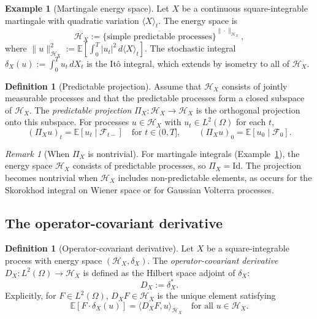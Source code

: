 \documentclass[11pt,a4paper]{article}
\theoremstyle{plain}
\theoremstyle{definition}
\newtheorem{definition}[theorem]{Definition}
\newtheorem{example}[theorem]{Example}
\theoremstyle{remark}
\newtheorem{remark}[theorem]{Remark}
\newcommand{\E}{\mathbb{E}}
\newcommand{\Id}{\mathrm{Id}}
\newcommand{\ip}[2]{\langle #1, #2 \rangle}
\newcommand{\norm}[1]{\| #1 \|}
\newcommand{\Lp}[1]{L^{#1}}
\newcommand{\Fminus}{\mathcal{F}_{t-}}
\newcommand{\HX}{\mathcal{H}_X}
\begin{document}
\begin{example}[Martingale energy space]\label{ex:martingale-energy}
Let $X$ be a continuous square-integrable martingale with quadratic variation $\langle X \rangle_t$. The energy space is
\[
\HX := \overline{\{\text{simple predictable processes}\}}^{\norm{\cdot}_{\HX}},
\]
where $\norm{u}_{\HX}^2 := \E\left[\int_0^T |u_t|^2 \, d\langle X \rangle_t\right]$. The stochastic integral $\delta_X(u) := \int_0^T u_t \, dX_t$ is the It\^o integral, which extends by isometry to all of $\HX$.
\end{example}

\begin{definition}[Predictable projection]\label{def:pred-proj}
Assume that $\HX$ consists of jointly measurable processes and that the predictable processes form a closed subspace of $\HX$. The \emph{predictable projection} $\Pi_X: \HX \to \HX$ is the orthogonal projection onto this subspace. For processes $u \in \HX$ with $u_t \in \Lp{2}(\Omega)$ for each $t$,
\[
(\Pi_X u)_t = \E[u_t \mid \Fminus] \quad \text{for } t \in (0,T], \qquad (\Pi_X u)_0 = \E[u_0 \mid \mathcal{F}_0].
\]
\end{definition}

\begin{remark}[When $\Pi_X$ is nontrivial]\label{rem:pi-nontrivial}
For martingale integrals (Example~\ref{ex:martingale-energy}), the energy space $\HX$ consists of predictable processes, so $\Pi_X = \Id$. The projection becomes nontrivial when $\HX$ includes non-predictable elements, as occurs for the Skorokhod integral on Wiener space or for Gaussian Volterra processes.
\end{remark}

\subsection{The operator-covariant derivative}

\begin{definition}[Operator-covariant derivative]\label{def:operator-cov}
Let $X$ be a square-integrable process with energy space $(\HX, \delta_X)$. The \emph{operator-covariant derivative} $D_X: \Lp{2}(\Omega) \to \HX$ is defined as the Hilbert space adjoint of $\delta_X$:
\[
D_X := \delta_X^*.
\]
Explicitly, for $F \in \Lp{2}(\Omega)$, $D_X F \in \HX$ is the unique element satisfying
\begin{equation}\label{eq:Riesz-def}
\E[F \cdot \delta_X(u)] = \ip{D_X F}{u}_{\HX} \quad \text{for all } u \in \HX.
\end{equation}
\end{definition}
\end{document}
